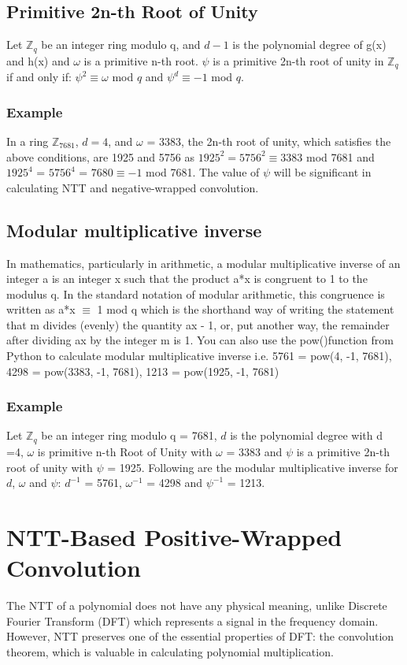 \documentclass{techrep}
\theoremstyle{definition}
\theoremstyle{plain}
\newcommand{\Z}{\mathbb{Z}}
\begin{document}
	\subsection{Primitive 2n-th Root of Unity}
	Let $\Z_{q}$  be an integer ring modulo q, and $d - 1$ is the polynomial degree of g(x) and h(x) and $\omega$ is a primitive n-th root. $\psi$ is a primitive 2n-th root of unity in $\Z_{q}$ if and only if:
	$\psi^2 \equiv \omega$ mod $q$ and $\psi^d \equiv {-1}$ mod $q$.

	\subsubsection{Example}

	In a ring $\Z_{7681}$, $d = 4$, and $\omega$ = 3383, the 2n-th root of unity, which satisfies the above conditions, are 1925 and 5756 as $1925^2 = 5756^2 \equiv 3383$ mod 7681 and $1925^4$ = $5756^4$ = $7680 \equiv -1$ mod 7681. The value of $\psi$  will be significant in calculating NTT and negative-wrapped convolution.

	\subsection{Modular multiplicative inverse}
	In mathematics, particularly in arithmetic, a modular multiplicative inverse of an integer a is an integer x such that the product a*x is congruent to 1 to the modulus q. In the standard notation of modular arithmetic, this congruence is written as
	a*x $\equiv$ 1 mod q
	which is the shorthand way of writing the statement that m divides (evenly) the quantity ax - 1, or, put another way, the remainder after dividing ax by the integer m is 1. You can also use the pow()function from Python to calculate modular multiplicative inverse i.e. 5761 = pow(4, -1, 7681), 4298 = pow(3383, -1, 7681), 1213 = pow(1925, -1, 7681)

	\subsubsection{Example}
	Let $\Z_{q}$  be an integer ring modulo q = 7681, $d$ is the polynomial degree with d =4, $\omega$ is primitive n-th Root of Unity with $\omega$ = 3383 and  $\psi$ is a primitive 2n-th root of unity with $\psi$ = 1925.  Following are the modular multiplicative inverse for $d$, $\omega$ and $\psi$:
	$d^{-1}$ = 5761, $\omega^{-1}$ = 4298 and $\psi^{-1}$ = 1213.


	\section{NTT-Based Positive-Wrapped Convolution}
	The NTT of a polynomial does not have any physical meaning, unlike Discrete Fourier Transform (DFT) which represents a signal in the frequency domain. However, NTT preserves one of the essential properties of DFT: the convolution theorem, which is valuable in calculating polynomial multiplication.
\end{document}
